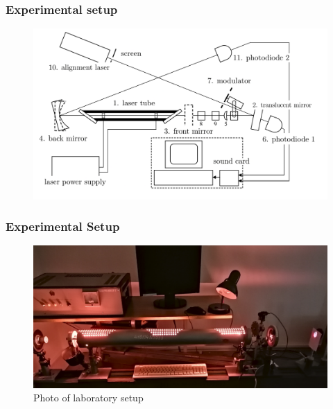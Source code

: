 \documentclass{beamer}
\begin{document}
\begin{frame}
	\frametitle{Experimental setup}
	\begin{figure}
		\centering
		\includegraphics[width=1.1\linewidth]{res/experimental_setup.pdf}
	\end{figure}
	
\end{frame}


\begin{frame}
	\frametitle{Experimental Setup}

	\begin{figure}
		\centering
		\includegraphics[width=1\linewidth]{res/setup.png}
		\caption{Photo of laboratory setup}
	\end{figure}
\end{frame}
\end{document}
